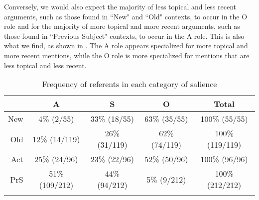 Conversely, we would also expect the majority of less topical and less recent arguments, such as those found in ``New" and ``Old" contexts, to occur in the O role and for the majority of more topical and more recent arguments, such as those found in ``Previous Subject" contexts, to occur in the A role. This is also what we find, as shown in . The A role  appears specialized for more topical and more recent mentions, while the O role is more specialized for mentions that are less topical and less recent. 
\begin{table}

\caption{{Frequency of referents in each category of salience}}
\begin{tabular}{ r  c  c  c  c }
\lsptoprule
  & \textsc{A} & \textsc{S} & \textsc{O} & Total\\

\midrule
 New & 4{\%} (2/55) & 33{\%} (18/55) & 63{\%} (35/55)  & 100{\%} (55/55) \\

  Old & 12{\%} (14/119) & 26{\%} (31/119) & 62{\%} (74/119) & 100{\%} (119/119) \\

  Act & 25{\%} (24/96) & 23{\%} (22/96) & 52{\%} (50/96) & 100{\%} (96/96) \\

PrS & 51{\%} (109/212) & 44{\%} (94/212) & 5{\%} (9/212) & 100{\%} (212/212) \\

\lspbottomrule
\end{tabular}\\
\label{totalsalience2}

\end{table}


